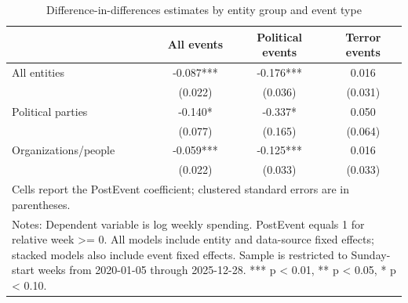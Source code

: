 \begin{table}[!htbp]
\centering
\caption{Difference-in-differences estimates by entity group and event type}
\label{tab:did_key_results_post_from_0}
\begin{tabular}{lccc}
\hline\hline
 & All events & Political events & Terror events \\
\hline
All entities & -0.087*** & -0.176*** & 0.016 \\
 & (0.022) & (0.036) & (0.031) \\
Political parties & -0.140* & -0.337* & 0.050 \\
 & (0.077) & (0.165) & (0.064) \\
Organizations/people & -0.059*** & -0.125*** & 0.016 \\
 & (0.022) & (0.033) & (0.033) \\
\hline
\multicolumn{4}{l}{\footnotesize Cells report the PostEvent coefficient; clustered standard errors are in parentheses.}\\
\multicolumn{4}{l}{\footnotesize Notes: Dependent variable is log weekly spending. PostEvent equals 1 for relative week >= 0. All models include entity and data-source fixed effects; stacked models also include event fixed effects. Sample is restricted to Sunday-start weeks from 2020-01-05 through 2025-12-28. *** p < 0.01, ** p < 0.05, * p < 0.10.}\\
\hline\hline
\end{tabular}
\end{table}
